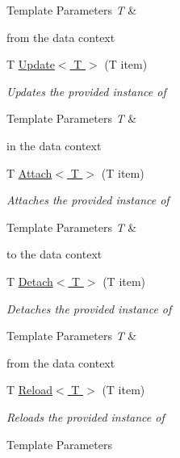 \begin{DoxyCompactItemize}
\begin{DoxyCompactList}
\begin{DoxyTemplParams}{Template Parameters}
{\em T} & \\
\hline
\end{DoxyTemplParams}
from the data context \end{DoxyCompactList}\item 
T \hyperlink{class_framework_extension_1_1_entity_framework_1_1_contexts_1_1_entity_framework_context_a02b78487a49ea0d42aeee143bff5c0bc}{Update$<$ T $>$} (T item)
\begin{DoxyCompactList}\small\item\em Updates the provided instance of 
\begin{DoxyTemplParams}{Template Parameters}
{\em T} & \\
\hline
\end{DoxyTemplParams}
in the data context \end{DoxyCompactList}\item 
T \hyperlink{class_framework_extension_1_1_entity_framework_1_1_contexts_1_1_entity_framework_context_a44750d8bf54f6d8ba284d46544c221fb}{Attach$<$ T $>$} (T item)
\begin{DoxyCompactList}\small\item\em Attaches the provided instance of 
\begin{DoxyTemplParams}{Template Parameters}
{\em T} & \\
\hline
\end{DoxyTemplParams}
to the data context \end{DoxyCompactList}\item 
T \hyperlink{class_framework_extension_1_1_entity_framework_1_1_contexts_1_1_entity_framework_context_a057c2858fd25f18db69fc85b86eb2019}{Detach$<$ T $>$} (T item)
\begin{DoxyCompactList}\small\item\em Detaches the provided instance of 
\begin{DoxyTemplParams}{Template Parameters}
{\em T} & \\
\hline
\end{DoxyTemplParams}
from the data context \end{DoxyCompactList}\item 
T \hyperlink{class_framework_extension_1_1_entity_framework_1_1_contexts_1_1_entity_framework_context_ac8c74190bfe433a8eae0658616bad089}{Reload$<$ T $>$} (T item)
\begin{DoxyCompactList}\small\item\em Reloads the provided instance of 
\begin{DoxyTemplParams}{Template Parameters}

\end{DoxyTemplParams}
\end{DoxyCompactList}
\end{DoxyCompactItemize}
